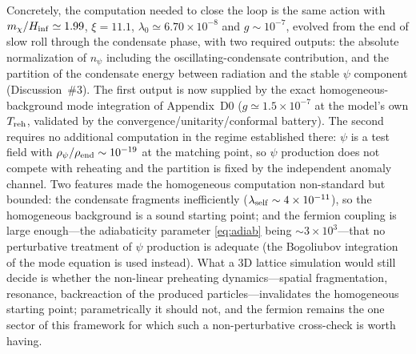 \documentclass[pdflatex,sn-mathphys-num]{sn-jnl}
\theoremstyle{thmstyleone}
\begin{document}
Concretely, the computation needed to close the loop is the same action with $m_\chi/H_{\rm inf}\simeq1.99$, $\xi=11.1$, $\lambda_0\simeq6.70\times10^{-8}$ and $g\sim10^{-7}$, evolved from the end of slow roll through the condensate phase, with two required outputs: the absolute normalization of $n_\psi$ including the oscillating-condensate contribution, and the partition of the condensate energy between radiation and the stable $\psi$ component (Discussion~\#3). The first output is now supplied by the exact homogeneous-background mode integration of Appendix~D0 ($g\simeq1.5\times10^{-7}$ at the model's own $T_{\rm reh}$, validated by the convergence/unitarity/conformal battery). The second requires no additional computation in the regime established there: $\psi$ is a test field with $\rho_\psi/\rho_{\rm end}\sim10^{-19}$ at the matching point, so $\psi$ production does not compete with reheating and the partition is fixed by the independent anomaly channel. Two features made the homogeneous computation non-standard but bounded: the condensate fragments inefficiently ($\lambda_{\rm self}\sim4\times10^{-11}$), so the homogeneous background is a sound starting point; and the fermion coupling is large enough---the adiabaticity parameter \eqref{eq:adiab} being $\sim3\times10^{3}$---that no perturbative treatment of $\psi$ production is adequate (the Bogoliubov integration of the mode equation is used instead). What a 3D lattice simulation would still decide is whether the non-linear preheating dynamics---spatial fragmentation, resonance, backreaction of the produced particles---invalidates the homogeneous starting point; parametrically it should not, and the fermion remains the one sector of this framework for which such a non-perturbative cross-check is worth having.
\end{document}

